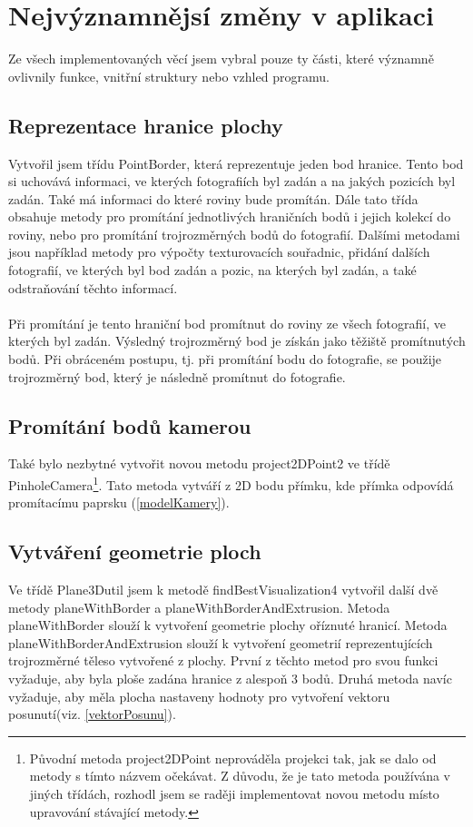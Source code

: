 \documentclass[11pt,twoside,a4paper]{book}
\begin{document}
\section{Nejvýznamnějsí změny v aplikaci}
Ze všech implementovaných věcí jsem vybral pouze ty části, které významně ovlivnily funkce, vnitřní struktury nebo vzhled programu. 

\subsection{Reprezentace hranice plochy}
Vytvořil jsem třídu PointBorder, která reprezentuje jeden bod hranice. Tento bod si uchovává informaci, ve kterých fotografiích byl zadán a na jakých pozicích byl zadán.  Také má informaci do které roviny bude promítán. Dále tato třída obsahuje metody pro promítání jednotlivých hraničních bodů i jejich kolekcí do roviny, nebo pro promítání trojrozměrných bodů do fotografií. Dalšími metodami jsou například metody pro výpočty texturovacích souřadnic, přidání dalších fotografií, ve kterých byl bod zadán a pozic, na kterých byl zadán, a také odstraňování těchto informací.
\paragraph{}
Při promítání je tento hraniční bod promítnut do roviny ze všech fotografií, ve kterých byl zadán. Výsledný trojrozměrný bod je získán jako těžiště promítnutých bodů. Při obráceném postupu, tj. při promítání bodu do fotografie, se použije trojrozměrný bod, který je následně promítnut do fotografie.

\subsection{Promítání bodů kamerou}
Také bylo nezbytné vytvořit novou metodu project2DPoint2 ve třídě PinholeCamera\footnote{Původní metoda project2DPoint neprováděla projekci tak, jak se dalo od metody s tímto názvem očekávat. Z důvodu, že je tato metoda používána v jiných třídách, rozhodl jsem se raději implementovat novou metodu místo upravování stávající metody.}. Tato metoda vytváří z 2D bodu přímku, kde přímka odpovídá promítacímu paprsku (\ref{modelKamery}).

\subsection{Vytváření geometrie ploch}
Ve třídě Plane3Dutil jsem k metodě findBestVisualization4 vytvořil další dvě metody planeWithBorder a planeWithBorderAndExtrusion. Metoda planeWithBorder slouží k vytvoření geometrie plochy oříznuté hranicí. Metoda planeWithBorderAndExtrusion slouží k vytvoření geometrií reprezentujících trojrozměrné těleso vytvořené z plochy. První z těchto metod pro svou funkci vyžaduje, aby byla ploše zadána hranice z alespoň 3 bodů. Druhá metoda navíc vyžaduje, aby měla plocha nastaveny hodnoty pro vytvoření vektoru posunutí(viz. \ref{vektorPosunu}).  
\end{document}
